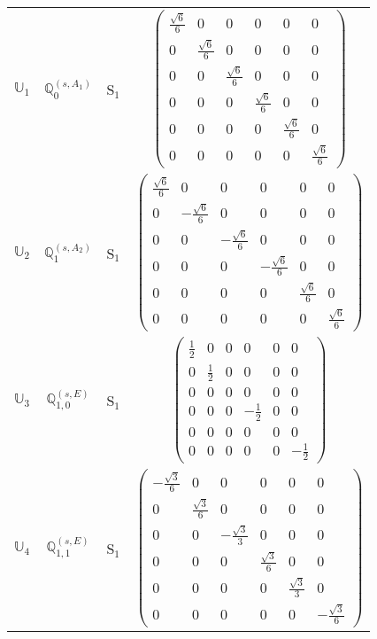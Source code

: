 \documentclass[fleqn,10pt,landscape]{article}
\begin{document}
\begin{itemize}
\begin{center}
\begin{longtable}{c|c|c|c}
$ \mathbb{U}_{1} $ & $\mathbb{Q}_{0}^{(s,A_{1})}$ & S$_{1}$ & $\begin{pmatrix} \frac{\sqrt{6}}{6} & 0 & 0 & 0 & 0 & 0 \\ 0 & \frac{\sqrt{6}}{6} & 0 & 0 & 0 & 0 \\ 0 & 0 & \frac{\sqrt{6}}{6} & 0 & 0 & 0 \\ 0 & 0 & 0 & \frac{\sqrt{6}}{6} & 0 & 0 \\ 0 & 0 & 0 & 0 & \frac{\sqrt{6}}{6} & 0 \\ 0 & 0 & 0 & 0 & 0 & \frac{\sqrt{6}}{6} \end{pmatrix}$ \\
$ \mathbb{U}_{2} $ & $\mathbb{Q}_{1}^{(s,A_{2})}$ & S$_{1}$ & $\begin{pmatrix} \frac{\sqrt{6}}{6} & 0 & 0 & 0 & 0 & 0 \\ 0 & - \frac{\sqrt{6}}{6} & 0 & 0 & 0 & 0 \\ 0 & 0 & - \frac{\sqrt{6}}{6} & 0 & 0 & 0 \\ 0 & 0 & 0 & - \frac{\sqrt{6}}{6} & 0 & 0 \\ 0 & 0 & 0 & 0 & \frac{\sqrt{6}}{6} & 0 \\ 0 & 0 & 0 & 0 & 0 & \frac{\sqrt{6}}{6} \end{pmatrix}$ \\
$ \mathbb{U}_{3} $ & $\mathbb{Q}_{1,0}^{(s,E)}$ & S$_{1}$ & $\begin{pmatrix} \frac{1}{2} & 0 & 0 & 0 & 0 & 0 \\ 0 & \frac{1}{2} & 0 & 0 & 0 & 0 \\ 0 & 0 & 0 & 0 & 0 & 0 \\ 0 & 0 & 0 & - \frac{1}{2} & 0 & 0 \\ 0 & 0 & 0 & 0 & 0 & 0 \\ 0 & 0 & 0 & 0 & 0 & - \frac{1}{2} \end{pmatrix}$ \\
$ \mathbb{U}_{4} $ & $\mathbb{Q}_{1,1}^{(s,E)}$ & S$_{1}$ & $\begin{pmatrix} - \frac{\sqrt{3}}{6} & 0 & 0 & 0 & 0 & 0 \\ 0 & \frac{\sqrt{3}}{6} & 0 & 0 & 0 & 0 \\ 0 & 0 & - \frac{\sqrt{3}}{3} & 0 & 0 & 0 \\ 0 & 0 & 0 & \frac{\sqrt{3}}{6} & 0 & 0 \\ 0 & 0 & 0 & 0 & \frac{\sqrt{3}}{3} & 0 \\ 0 & 0 & 0 & 0 & 0 & - \frac{\sqrt{3}}{6} \end{pmatrix}$ \\

\end{longtable}
\end{center}
\end{itemize}
\end{document}

